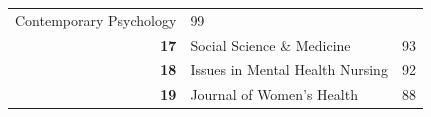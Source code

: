 \documentclass[]{tufte-handout}
\begin{document}
\begin{longtable}[]{@{}rlr@{}}
\begin{minipage}[t]{0.56\columnwidth}
Contemporary Psychology\strut
\end{minipage} & \begin{minipage}[t]{0.09\columnwidth}\raggedleft\strut
99\strut
\end{minipage}\tabularnewline
\begin{minipage}[t]{0.11\columnwidth}\raggedleft\strut
\textbf{17}\strut
\end{minipage} & \begin{minipage}[t]{0.56\columnwidth}\raggedright\strut
Social Science \& Medicine\strut
\end{minipage} & \begin{minipage}[t]{0.09\columnwidth}\raggedleft\strut
93\strut
\end{minipage}\tabularnewline
\begin{minipage}[t]{0.11\columnwidth}\raggedleft\strut
\textbf{18}\strut
\end{minipage} & \begin{minipage}[t]{0.56\columnwidth}\raggedright\strut
Issues in Mental Health Nursing\strut
\end{minipage} & \begin{minipage}[t]{0.09\columnwidth}\raggedleft\strut
92\strut
\end{minipage}\tabularnewline
\begin{minipage}[t]{0.11\columnwidth}\raggedleft\strut
\textbf{19}\strut
\end{minipage} & \begin{minipage}[t]{0.56\columnwidth}\raggedright\strut
Journal of Women's Health\strut
\end{minipage} & \begin{minipage}[t]{0.09\columnwidth}\raggedleft\strut
88\strut
\end{minipage}\tabularnewline
\bottomrule
\end{longtable}
\end{document}

